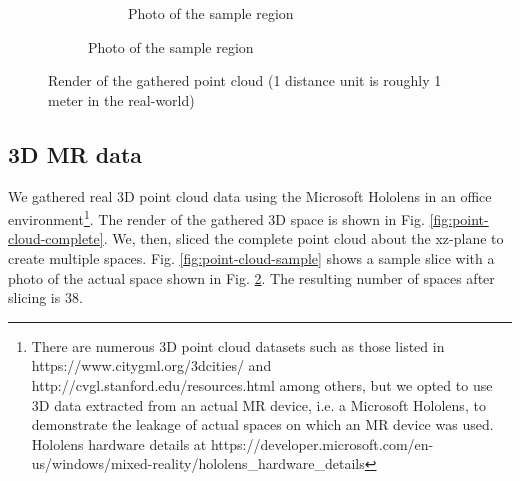 \begin{figure}[t]
\begin{subfigure}[]{0.34\columnwidth}
\begin{subfigure}[]{\textwidth}
    		\vspace{0mm}
    		\caption{\small\centering Photo of the sample region}
    		\label{fig:photo-sample}
		\end{subfigure}
	\end{subfigure}
	\vspace{-2mm}
	\caption{Render of the gathered point cloud \small{(1 distance unit is roughly 1 meter in the real-world)}}
	\label{fig:point-cloud}
	\vspace {-2mm}
\end{figure}

\subsection{3D MR data}\label{subsec:3d-mr-data}

We gathered real 3D point cloud data using the Microsoft Hololens in an office environment\footnote{There are numerous 3D point cloud datasets such as those listed in https://www.citygml.org/3dcities/ and http://cvgl.stanford.edu/resources.html among others, but we opted to use 3D data extracted from an actual MR device, i.e. a Microsoft Hololens, to demonstrate the leakage of actual spaces on which an MR device was used. Hololens hardware details at https://developer.microsoft.com/en-us/windows/mixed-reality/hololens\_hardware\_details}. The render of the gathered 3D space is shown in Fig. \ref{fig:point-cloud-complete}. We, then, sliced the complete point cloud about the xz-plane to create multiple spaces. Fig. \ref{fig:point-cloud-sample} shows a sample slice with a photo of the actual space shown in Fig. \ref{fig:photo-sample}. The resulting number of spaces after slicing is 38.

